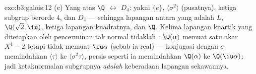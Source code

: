 \begin{solution}{exo:b3:galois:12}
(c) Yang  atas $\Q$ $\leftrightarrow$ 
$D_4$: yakni $\{e\}$, $\langle\sigma^2\rangle$ (pusatnya), ketiga
subgrup berorde $4$, dan $D_4$ --- sehingga lapangan antara yang
 adalah $L$, $\Q(\sqrt2, \iu)$, ketiga
lapangan kuadratnya, dan $\Q$. Kelima lapangan kuartik yang ditetapkan
oleh pencerminan tak normal tidaklah : $\Q(\alpha)$ memuat
satu akar $X^4 - 2$ tetapi tidak memuat $\iu\alpha$ (sebab ia real) ---
konjugasi dengan $\sigma$ memindahkan $\langle\tau\rangle$ ke
$\langle\sigma^2\tau\rangle$, persis seperti ia memindahkan
$\Q(\alpha)$ ke $\Q(\iu\alpha)$: jadi ketaknormalan
subgrupnya \emph{adalah} keberadaan lapangan sekawannya.
\end{solution}

